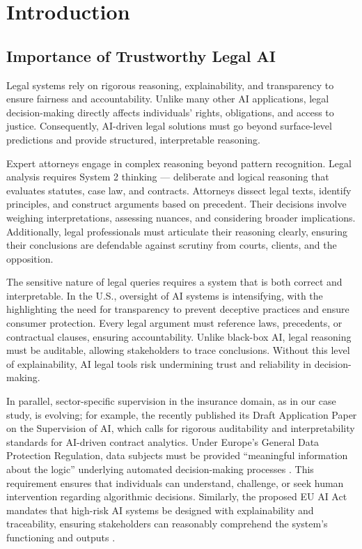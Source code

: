 \section{Introduction}
\subsection{Importance of Trustworthy Legal AI}
Legal systems rely on rigorous reasoning, explainability, and transparency to ensure fairness and accountability. Unlike many other AI applications, legal decision-making directly affects individuals' rights, obligations, and access to justice. Consequently, AI-driven legal solutions must go beyond surface-level predictions and provide structured, interpretable reasoning.

Expert attorneys engage in complex reasoning beyond pattern recognition. Legal analysis requires System 2 thinking — deliberate and logical reasoning that evaluates statutes, case law, and contracts. Attorneys dissect legal texts, identify principles, and construct arguments based on precedent. Their decisions involve weighing interpretations, assessing nuances, and considering broader implications. Additionally, legal professionals must articulate their reasoning clearly, ensuring their conclusions are defendable against scrutiny from courts, clients, and the opposition. 

The sensitive nature of legal queries requires a system that is both correct and interpretable. In the U.S., oversight of AI systems is intensifying, with the \citet{BipartisanAI2024} highlighting the need for transparency to prevent deceptive practices and ensure consumer protection. Every legal argument must reference laws, precedents, or contractual clauses, ensuring accountability. Unlike black-box AI, legal reasoning must be auditable, allowing stakeholders to trace conclusions. Without this level of explainability, AI legal tools risk undermining trust and reliability in decision-making.

In parallel, sector-specific supervision in the insurance domain, as in our case study, is evolving; for example, the \citet{IAIS2024} recently published its Draft Application Paper on the Supervision of AI, which calls for rigorous auditability and interpretability standards for AI-driven contract analytics. Under Europe's General Data Protection Regulation, data subjects must be provided “meaningful information about the logic” underlying automated decision-making processes \cite{GDPR2016}. This requirement ensures that individuals can understand, challenge, or seek human intervention regarding algorithmic decisions. Similarly, the proposed EU AI Act mandates that high-risk AI systems be designed with explainability and traceability, ensuring stakeholders can reasonably comprehend the system’s functioning and outputs \cite{EUAIAct2023}. 

